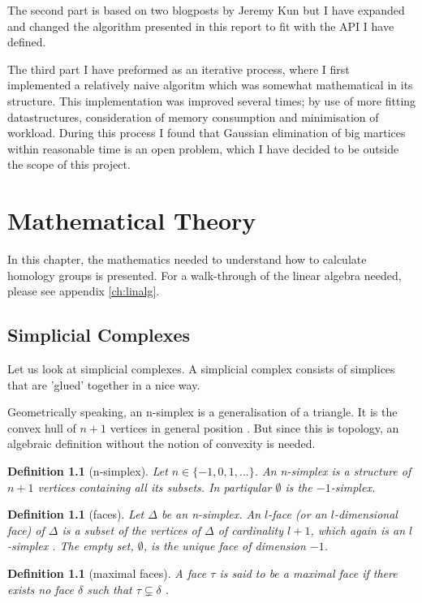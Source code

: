 \documentclass[11pt,a4paper,twoside]{report}
\newtheorem{mydef}[mythm]{Definition}
\begin{document}
The second part is based on two blogposts by Jeremy Kun \cite{KunPrimer}\cite{Kun} but I have expanded and changed the algorithm presented in this report to fit with the API I have defined.

The third part I have preformed as an iterative process, where I first implemented a relatively naive algoritm which was somewhat mathematical in its structure. This implementation was improved several times; by use of more fitting datastructures, consideration of memory consumption and minimisation of workload. During this process I found that Gaussian elimination of big martices within reasonable time is an open problem, which I have decided to be outside the scope of this project.

\chapter{Mathematical Theory} \label{ch:theory}
In this chapter, the mathematics needed to understand how to calculate homology groups is presented. For a walk-through of the linear algebra needed, please see appendix \ref{ch:linalg}.

\section{Simplicial Complexes}
Let us look at simplicial complexes. A simplicial complex consists of simplices that are 'glued' together in a nice way.

Geometrically speaking, an n-simplex is a generalisation of a triangle. It is the convex hull of $n+1$ vertices in general position \cite{Nadathur}. But since this is topology, an algebraic definition without the notion of convexity is needed.

\begin{mydef}[n-simplex]
Let $n\in\{-1,0,1,\dots\}$. An n-simplex is a structure of $n+1$ vertices containing all its subsets. In partiqular $\emptyset$ is the $-1$-simplex.
\end{mydef}

\begin{mydef}[faces]
Let $\Delta$ be an n-simplex. An $l$-face (or an $l$-dimensional face) of $\Delta$ is a subset of the vertices of $\Delta$ of cardinality $l+1$, which again is an $l$-simplex \cite{Nadathur}. The empty set, $\emptyset$, is the unique face of dimension $-1$\cite{Allgaier}.
\end{mydef}

\begin{mydef}[maximal faces]
A face $\tau$ is said to be a maximal face if there exists no face $\delta$ such that $\tau \subsetneq \delta$ \cite[p.15]{Jonsson}.
\end{mydef}
\end{document}
